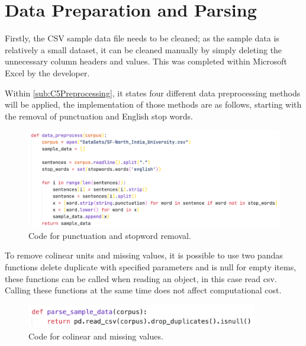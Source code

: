 \section{Data Preparation and Parsing}

Firstly, the CSV sample data file needs to be cleaned; as the sample data is relatively a small dataset, it can be cleaned manually by simply deleting the unnecessary column headers and values. This was completed within Microsoft Excel by the developer.

Within \autoref{sub:C5Preprocessing}, it states four different data preprocessing methods will be applied, the implementation of those methods are as follows, starting with the removal of punctuation and English stop words.

\begin{figure}[H]
    \centering
    \includegraphics[width=\textwidth]{figures/chapter-6/data_preprocess.png}
    \caption[Code for punctuation and stopword removal]{Code for punctuation and stopword removal.
    \label{fig:data_preprocess}}
\end{figure}

\newpage

To remove colinear units and missing values, it is possible to use two pandas functions delete duplicate with specified parameters and is null for empty items, these functions can be called when reading an object, in this case read csv. Calling these functions at the same time does not affect computational cost.

\begin{figure}[H]
    \centering
    \includegraphics[width=0.9\textwidth]{figures/chapter-6/parse_sample.png}
    \caption[Code for colinear and missing values]{Code for colinear and missing values.
    \label{fig:parse_sample}}
\end{figure}

